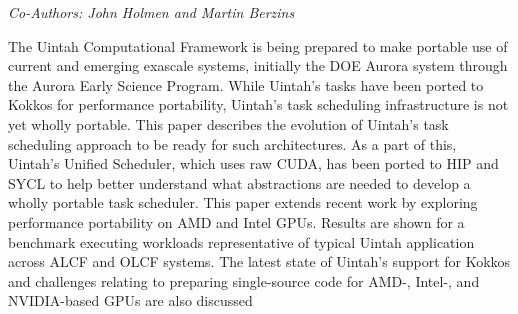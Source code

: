 \begin{center}
\textit{Co-Authors: John Holmen and Martin	Berzins}
\end{center} 
The Uintah Computational Framework is being prepared to make portable use of current and emerging exascale systems, initially the DOE Aurora system through the Aurora Early Science Program. While Uintah's tasks have been ported to Kokkos for performance portability, Uintah's task scheduling infrastructure is not yet wholly portable. This paper describes the evolution of Uintah's task scheduling approach to be ready for such architectures. As a part of this, Uintah's Unified Scheduler, which uses raw CUDA, has been ported to HIP and SYCL to help better understand what abstractions are needed to develop a wholly portable task scheduler. This paper extends recent work by exploring performance portability on AMD and Intel GPUs. Results are shown for a benchmark executing workloads representative of typical Uintah application across ALCF and OLCF systems. The latest state of Uintah’s support for Kokkos and challenges relating to preparing single-source code for AMD-, Intel-, and NVIDIA-based GPUs are also discussed